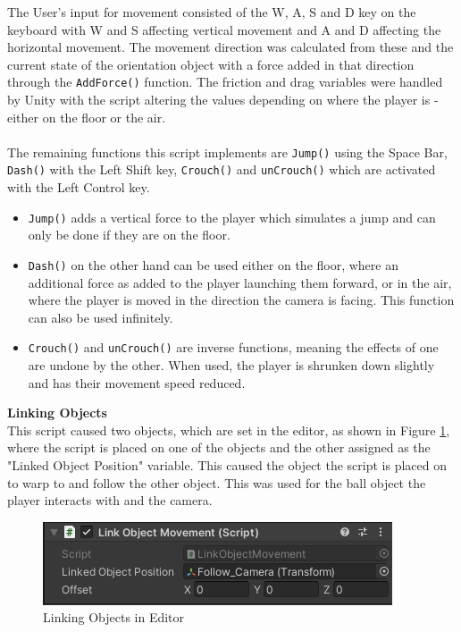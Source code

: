 \noindent The User's input for movement consisted of the W, A, S and D key on the keyboard with W and S affecting vertical movement and A and D affecting the horizontal movement. The movement direction was calculated from these and the current state of the orientation object with a force added in that direction through the \texttt{AddForce()} function. The friction and drag variables were handled by Unity with the script altering the values depending on where the player is - either on the floor or the air. 
\\\\
The remaining functions this script implements are \texttt{Jump()} using the Space Bar, \texttt{Dash()} with the Left Shift key, \texttt{Crouch()} and \texttt{unCrouch()} which are activated with the Left Control key. 
\begin{itemize} 
\item \texttt{Jump()} adds a vertical force to the player which simulates a jump and can only be done if they are on the floor. 
\item \texttt{Dash()} on the other hand can be used either on the floor, where an additional force as added to the player launching them forward, or in the air, where the player is moved in the direction the camera is facing. This function can also be used infinitely. 
\item \texttt{Crouch()} and \texttt{unCrouch()} are inverse functions, meaning the effects of one are undone by the other. When used, the player is shrunken down slightly and has their movement speed reduced.
\end{itemize}

\noindent \textbf{Linking Objects}\\
This script caused two objects, which are set in the editor, as shown in Figure \ref{link}, where the script is placed on one of the objects and the other assigned as the "Linked Object Position" variable. This caused the object the script is placed on to warp to and follow the other object. This was used for the ball object the player interacts with and the camera.

\begin{figure}[H]
\centering
\includegraphics[scale=1]{Figures/link.png}
\caption{Linking Objects in Editor}
\label{link}
\end{figure}


